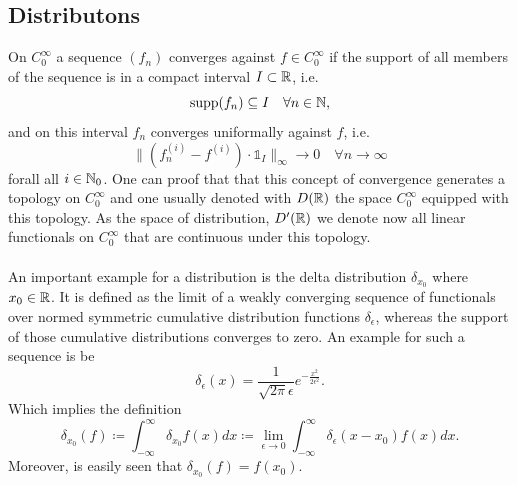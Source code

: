 \subsection*{Distributons}
	On $C_{0}^{\infty}$ a sequence $(f_{n})$ converges against $f \in C_{0}^{\infty}$ if the support of all members of the sequence is in a compact interval $I \subset \mathbb{R}$, i.e.
	$$ \operatorname{supp} (f_{n}) \subseteq I \quad \forall n \in \mathbb{N}, $$
	and on this interval $f_{n}$ converges uniformally against $f$, i.e.
	\[ \| (f_{n}^{(i)} - f^{(i)}) \cdot \mathds{1}_{I} \|_{\infty} \rightarrow 0 \quad \forall n \rightarrow \infty \]
forall all $i \in \mathbb{N}_{0}$. One can proof that that this concept of convergence generates a topology on $C_{0}^{\infty}$ and one usually denoted with $D(\mathbb{R})$ the space $C_{0}^{\infty}$ equipped with this topology. As the space of distribution, $D'(\mathbb{R})$ we denote now all linear functionals on $C_{0}^{\infty}$ that are continuous under this topology. 
~\\ ~\\
An important example for a distribution is the delta distribution $\delta_{x_{0}}$ where $x_{0} \in \mathbb{R}$. It is defined as the limit of a weakly converging sequence of functionals over normed symmetric cumulative distribution functions $\delta_{\epsilon}$, whereas the support of those cumulative distributions converges to zero. An example for such a sequence is be
	\[ \delta_{\epsilon}(x) = \frac{1}{\sqrt{2 \pi} \epsilon} e^{-\frac{x^{2}}{2 \epsilon^{2}}}. \]
Which implies the definition
	\[ \delta_{x_{0}}(f) \coloneqq \int_{-\infty}^{\infty} \delta_{x_{0}} f(x) dx \coloneqq \lim_{\epsilon \rightarrow 0} \int_{-\infty}^{\infty} \delta_{\epsilon}(x - x_{0}) f(x) dx. \]
Moreover, is easily seen that $\delta_{x_{0}}(f) = f(x_{0})$.
